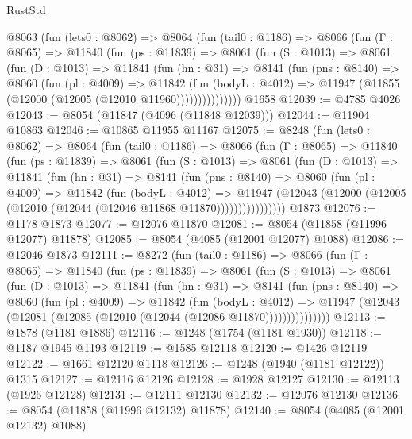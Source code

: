 \begin{lexlean}{RustStd}
\begin{coremodule}
    @8063
      (fun (lets0 : @8062) =>
      @8064
        (fun (tail0 : @1186) =>
        @8066
          (fun (Γ : @8065) =>
          @11840
            (fun (ps : @11839) =>
            @8061
              (fun (S : @1013) =>
              @8061
                (fun (D : @1013) =>
                @11841
                  (fun (hn : @31) =>
                  @8141
                    (fun (pns : @8140) =>
                    @8060
                      (fun (pl : @4009) =>
                      @11842
                        (fun (bodyL : @4012) =>
                        @11947 (@11855 (@12000 (@12005 (@12010 @11960)))))))))))))))
    @1658
@12039 := @4785 @4026
@12043 := @8054 (@11847 (@4096 (@11848 @12039)))
@12044 := @11904 @10863
@12046 := @10865 @11955 @11167
@12075 := @8248
    (fun (lets0 : @8062) =>
    @8064
      (fun (tail0 : @1186) =>
      @8066
        (fun (Γ : @8065) =>
        @11840
          (fun (ps : @11839) =>
          @8061
            (fun (S : @1013) =>
            @8061
              (fun (D : @1013) =>
              @11841
                (fun (hn : @31) =>
                @8141
                  (fun (pns : @8140) =>
                  @8060
                    (fun (pl : @4009) =>
                    @11842
                      (fun (bodyL : @4012) =>
                      @11947
                        (@12043
                          (@12000 (@12005 (@12010 (@12044 (@12046 @11868 @11870))))))))))))))))
    @1873
@12076 := @1178 @1873
@12077 := @12076 @11870
@12081 := @8054 (@11858 (@11996 @12077) @11878)
@12085 := @8054 (@4085 (@12001 @12077) @1088)
@12086 := @12046 @1873
@12111 := @8272
    (fun (tail0 : @1186) =>
    @8066
      (fun (Γ : @8065) =>
      @11840
        (fun (ps : @11839) =>
        @8061
          (fun (S : @1013) =>
          @8061
            (fun (D : @1013) =>
            @11841
              (fun (hn : @31) =>
              @8141
                (fun (pns : @8140) =>
                @8060
                  (fun (pl : @4009) =>
                  @11842
                    (fun (bodyL : @4012) =>
                    @11947 (@12043 (@12081 (@12085 (@12010 (@12044 (@12086 @11870)))))))))))))))
@12113 := @1878 (@1181 @1886)
@12116 := @1248 (@1754 (@1181 @1930))
@12118 := @1187 @1945 @1193
@12119 := @1585 @12118
@12120 := @1426 @12119
@12122 := @1661 @12120 @1118
@12126 := @1248 (@1940 (@1181 @12122)) @1315
@12127 := @12116 @12126
@12128 := @1928 @12127
@12130 := @12113 (@1926 @12128)
@12131 := @12111 @12130
@12132 := @12076 @12130
@12136 := @8054 (@11858 (@11996 @12132) @11878)
@12140 := @8054 (@4085 (@12001 @12132) @1088)

\end{coremodule}
\end{lexlean}
